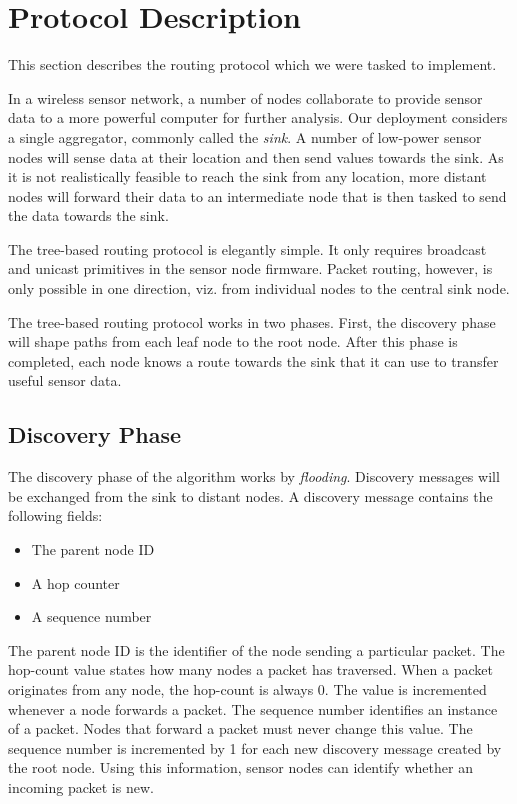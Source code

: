 \documentclass[a4paper]{llncs}
\begin{document}
\section{Protocol Description}

This section describes the routing protocol which we were tasked to implement.

In a wireless sensor network, a number of nodes collaborate to provide sensor data to a more powerful computer for further analysis.
Our deployment considers a single aggregator, commonly called the \textit{sink}.
A number of low-power sensor nodes will sense data at their location and then send values towards the sink.
As it is not realistically feasible to reach the sink from any location, more distant nodes will forward their data to an intermediate node that is then tasked to send the data towards the sink.

The tree-based routing protocol is elegantly simple.
It only requires broadcast and unicast primitives in the sensor node firmware.
Packet routing, however, is only possible in one direction, viz. from individual nodes to the central sink node.

The tree-based routing protocol works in two phases.
First, the discovery phase will shape paths from each leaf node to the root node.
After this phase is completed, each node knows a route towards the sink that it can use to transfer useful sensor data.

\subsection{Discovery Phase}



The discovery phase of the algorithm works by \textit{flooding}.
Discovery messages will be exchanged from the sink to distant nodes.
A discovery message contains the following fields:

\begin{itemize}
\item The parent node ID
\item A hop counter
\item A sequence number
\end{itemize}

The parent node ID is the identifier of the node sending a particular packet.
The hop-count value states how many nodes a packet has traversed.
When a packet originates from any node, the hop-count is always 0.
The value is incremented whenever a node forwards a packet.
The sequence number identifies an instance of a packet.
Nodes that forward a packet must never change this value.
The sequence number is incremented by 1 for each new discovery message created by the root node.
Using this information, sensor nodes can identify whether an incoming packet is new.
\end{document}
